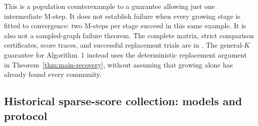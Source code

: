 \documentclass[11pt]{article}
\theoremstyle{definition}
\theoremstyle{remark}
\numberwithin{equation}{section}
\begin{document}
This is a population counterexample to a guarantee allowing just one
intermediate M-step. It does not establish failure when every growing stage
is fitted to convergence: two M-steps per stage succeed in this same example.
It is also not a sampled-graph failure theorem. The complete matrix, strict
comparison certificates, score traces, and successful replacement trials are
in .
The general-$K$ guarantee for Algorithm~1 instead uses the deterministic
replacement argument in Theorem~\ref{thm:main-recovery}, without assuming
that growing alone has already found every community.

\subsection{Historical sparse-score collection: models and protocol}
\end{document}
